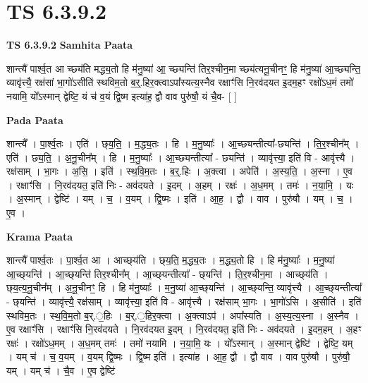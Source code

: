 \documentclass[17pt]{extarticle}
\begin{document}
\section{ TS 6.3.9.2 }

\textbf{TS 6.3.9.2 } \newline
\textbf{Samhita Paata} \newline

शान्त्यै॑ पार्श्व॒त आ च्छ्य॑ति मद्ध्य॒तो हि म॑नु॒ष्या॑ आ॒ च्छ्यन्ति॑ तिर॒श्चीन॒मा च्छ्य॑त्यनू॒चीनꣳ॒॒ हि म॑नु॒ष्या॑ आ॒च्छ्यन्ति॒ व्यावृ॑त्त्यै॒ रक्ष॑सां भा॒गो॑ऽसीति॑ स्थविम॒तो ब॒र्॒.हिर॒क्त्वाऽपा᳚स्यत्य॒स्नैव रक्षाꣳ॑सि नि॒रव॑दयत इ॒दम॒हꣳ रक्षो॑ऽध॒मं तमो॑ नयामि॒ यो᳚ऽस्मान् द्वेष्टि॒ यं च॑ व॒यं द्वि॒ष्म इत्या॑ह॒ द्वौ वाव पुरु॑षौ॒ यं चै॒व- [  ] \newline

\textbf{Pada Paata} \newline

शान्त्यै᳚ । पा॒र्श्व॒तः । एति॑ । छ्‌य॒ति॒ । म॒द्ध्य॒तः । हि । म॒नु॒ष्याः᳚ । आ॒च्छ्यन्तीत्या᳚-छ्यन्ति॑ । ति॒र॒श्चीन᳚म् । एति॑ । छ्य॒ति॒ । अ॒नू॒चीन᳚म् । हि । म॒नु॒ष्याः᳚ । आ॒च्छ्यन्तीत्या᳚ - छ्यन्ति॑ । व्यावृ॑त्त्या॒ इति॑ वि - आवृ॑त्त्यै । रक्ष॑साम् । भा॒गः । अ॒सि॒ । इति॑ । स्थ॒वि॒म॒तः । ब॒र्॒.हिः । अ॒क्त्वा । अपेति॑ । अ॒स्य॒ति॒ । अ॒स्ना । ए॒व । रक्षाꣳ॑सि । नि॒रव॑दयत॒ इति॑ निः - अव॑दयते । इ॒दम् । अ॒हम् । रक्षः॑ । अ॒ध॒मम् । तमः॑ । न॒या॒मि॒ । यः । अ॒स्मान् । द्वेष्टि॑ । यम् । च॒ । व॒यम् । द्वि॒ष्मः । इति॑ । आ॒ह॒ । द्वौ । वाव । पुरु॑षौ । यम् । च॒ । ए॒व ।  \newline


\textbf{Krama Paata} \newline

शान्त्यै॑ पार्श्व॒तः । पा॒र्श्व॒त आ । आच्छ्‌य॑ति । छ्‌य॒ति॒ म॒द्ध्य॒तः । म॒द्ध्य॒तो हि । हि म॑नु॒ष्याः᳚ । म॒नु॒ष्या॑ आ॒च्छ्‌यन्ति॑ । आ॒च्छ्‌यन्ति॑ तिर॒श्चीन᳚म् । आ॒च्छ्‌यन्तीत्या᳚ - छ्‌यन्ति॑ । ति॒र॒श्चीन॒मा । आच्छ्‌य॑ति । छ्‌य॒त्य॒नू॒चीन᳚म् । अ॒नू॒चीनꣳ॒॒ हि । हि म॑नु॒ष्याः᳚ । म॒नु॒ष्या॑ आ॒च्छ्‌यन्ति॑ । आ॒च्छ्‌यन्ति॒ व्यावृ॑त्त्यै । आ॒च्छ्‌यन्तीत्या᳚ - छ्‌यन्ति॑ । व्यावृ॑त्त्यै॒ रक्ष॑साम् । व्यावृ॑त्त्या॒ इति॑ वि - आवृ॑त्त्यै । रक्ष॑साम् भा॒गः । भा॒गो॑ऽसि । अ॒सीति॑ । इति॑ स्थविम॒तः । स्थ॒वि॒म॒तो ब॒र्.॒हिः । ब॒र्.॒हिर॒क्त्वा । अ॒क्त्वाऽप॑ । अपा᳚स्यति । अ॒स्य॒त्य॒स्ना । अ॒स्नैव । ए॒व रक्षाꣳ॑सि । रक्षाꣳ॑सि नि॒रव॑दयते । नि॒रव॑दयत इ॒दम् । नि॒रव॑दयत॒ इति॑ निः - अव॑दयते । इ॒दम॒हम् । अ॒हꣳ रक्षः॑ । रक्षो॑ऽध॒मम् । अ॒ध॒मम् तमः॑ । तमो॑ नयामि । न॒या॒मि॒ यः । यो᳚ऽस्मान् । अ॒स्मान् द्वेष्टि॑ । द्वेष्टि॒ यम् । यम् च॑ । च॒ व॒यम् । व॒यम् द्वि॒ष्मः । द्वि॒ष्म इति॑ । इत्या॑ह । आ॒ह॒ द्वौ । द्वौ वाव । वाव पुरु॑षौ । पुरु॑षौ॒ यम् । यम् च॑ । चै॒व । ए॒व द्वेष्टि॑ \newline
\end{document}
